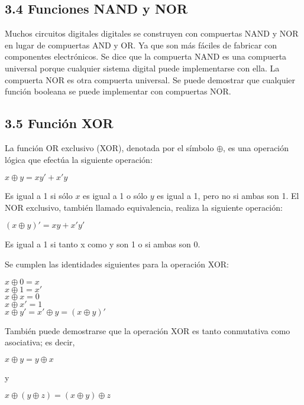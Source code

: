 \subsection*{3.4 Funciones NAND y NOR}
Muchos circuitos digitales digitales se construyen con compuertas NAND y NOR en
lugar de compuertas AND y OR. Ya que son m\'{a}s f\'{a}ciles de fabricar con componentes
electr\'{o}nicos. Se dice que la compuerta NAND es una compuerta universal porque cualquier
sistema digital puede implementarse con ella. La compuerta NOR es otra compuerta universal. Se puede
demostrar que cualquier funci\'{o}n booleana se puede implementar con compuertas NOR.

\subsection*{3.5 Funci\'{o}n XOR}
La funci\'{o}n OR exclusivo (XOR), denotada por el s\'{i}mbolo $\oplus$, es una operaci\'{o}n
l\'{o}gica que efect\'{u}a la siguiente operaci\'{o}n:
\begin{center}
    $x \oplus y = xy' + x'y$
\end{center}
Es igual a 1 si s\'{o}lo $x$ es igual a 1 o s\'{o}lo $y$ es igual a 1, pero no si ambas son 1.
El NOR exclusivo, tambi\'{e}n llamado equivalencia, realiza la siguiente operaci\'{o}n:
\begin{center}
    $(x \oplus y)' = xy + x'y'$
\end{center}
Es igual a 1 si tanto x como y son 1 o si ambas son 0.

Se cumplen las identidades siguientes para la operaci\'{o}n XOR:
\begin{center}
    $x \oplus 0 = x$ \\
    $x \oplus 1 = x'$ \\
    $x \oplus x = 0$ \\
    $x \oplus x' = 1$ \\
    $x \oplus y' = x' \oplus y = (x \oplus y)' $
\end{center}

Tambi\'{e}n puede demostrarse que la operaci\'{o}n XOR es tanto conmutativa como asociativa;
es decir,
\begin{center}
    $x \oplus y = y \oplus x$ \\
    \begin{flushleft}
        y
    \end{flushleft}
    $x \oplus (y \oplus z) = (x \oplus y) \oplus z$
\end{center}

